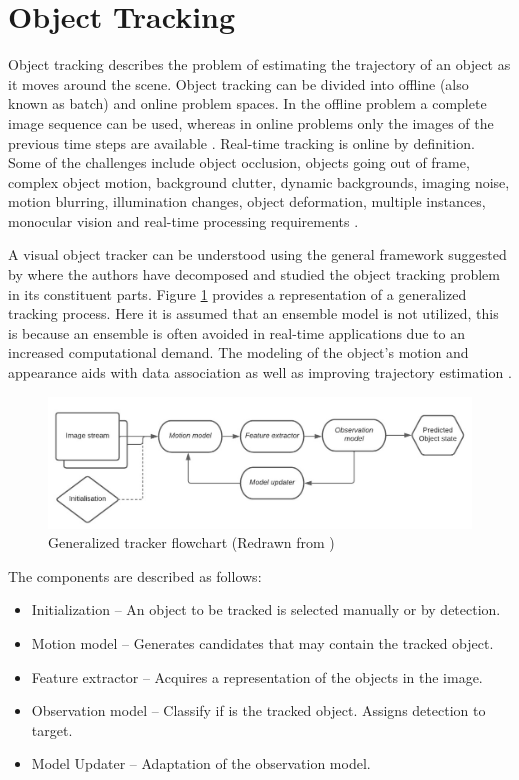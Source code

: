 \documentclass[a4paper,twoside,12pt]{report}
\begin{document}
\section{Object Tracking}

Object tracking describes the problem of estimating the trajectory of an object as it moves around the scene. Object tracking can be divided into offline (also known as batch) and online problem spaces. In the offline problem a complete image sequence can be used, whereas in online problems only the images of the previous time steps are available  \citep{track0}. Real-time tracking is online by definition. Some of the challenges include object occlusion, objects going out of frame, complex object motion, background clutter, dynamic backgrounds, imaging noise, motion blurring, illumination changes, object deformation, multiple instances, monocular vision and real-time processing requirements \citep{tradtrack0}.

A visual object tracker can be understood using the general framework suggested by \cite{diagnosingtrack} where the authors have decomposed and studied the object tracking problem in its constituent parts. Figure \ref{fig:tracker} provides a representation of a generalized tracking process. Here it is assumed that an ensemble model is not utilized, this is because an ensemble is often avoided in real-time applications due to an increased computational demand. The modeling of the object's motion and appearance aids with data association as well as improving trajectory estimation \citep{sort}.

\begin{figure}[h!]
\begin{center}
\includegraphics[width=13.5cm]{images/Tracking_flowchart.jpeg}
\caption{Generalized tracker flowchart (Redrawn from \cite{diagnosingtrack})}
\label{fig:tracker}
\end{center}
\end{figure}

\pagebreak
The components are described as follows:

\begin{itemize}
    \item Initialization -- An object to be tracked is selected manually or by detection.
    \item Motion model -- Generates candidates that may contain the tracked object.
    \item Feature extractor -- Acquires a representation of the objects in the image.
    \item Observation model -- Classify if is the tracked object. Assigns detection to target.
    \item Model Updater -- Adaptation of the observation model.
\end{itemize}
\end{document}
